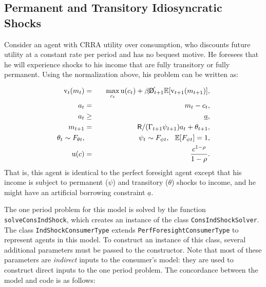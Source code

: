 \documentclass[12pt,titlepage,letterpaper]{econtex}
\newcommand{\E}{\mathbb{E}}
\begin{document}
\subsection{Permanent and Transitory Idiosyncratic Shocks}

Consider an agent with CRRA utility over consumption, who discounts future utility at a constant rate per period and has no bequest motive.  He foresees that he will experience shocks to his income that are fully transitory or fully permanent.  Using the normalization above, his problem can be written as:

\begin{eqnarray*}
\vFunc_t(m_t) &=& \max_{c_t} \utilFunc(c_t) + \beta \PLives_{t+1} \E [\vFunc_{t+1}(m_{t+1}) ], \\
a_t &=& m_t - c_t, \\
a_t &\geq& \underline{a}, \\
m_{t+1} &=& \Rfree/(\Gamma_{t+1} \psi_{t+1}) a_t + \theta_{t+1}, \\
\theta_t \sim F_{\theta t}, &\qquad& \psi_t \sim F_{\psi t}, \hspace{0.25cm} \E[F_{\psi t}] = 1, \\
\utilFunc(c) &=& \frac{c^{1-\CRRA}}{1-\CRRA}.
\end{eqnarray*}
That is, this agent is identical to the perfect foresight agent except that his income is subject to permanent ($\psi$) and transitory ($\theta$) shocks to income, and he might have an artificial borrowing constraint $\underline{a}$.

The one period problem for this model is solved by the function \texttt{solveConsIndShock}, which creates an instance of the class \texttt{ConsIndShockSolver}.  The class \texttt{IndShockConsumerType} extends \texttt{PerfForesightConsumerType} to represent agents in this model.  To construct an instance of this class, several additional parameters must be passed to the constructor.  Note that most of these parameters are \textit{indirect} inputs to the consumer's model: they are used to construct direct inputs to the one period problem.  The concordance between the model and code is as follows:
\end{document}
